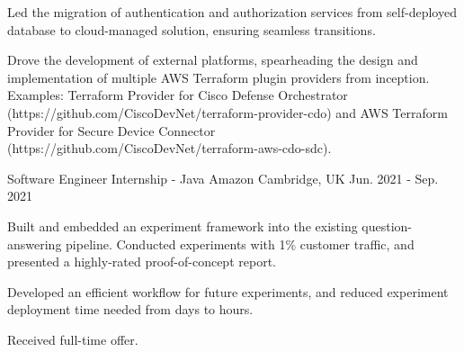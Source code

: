 \begin{cventries}
{\begin{cvitems}
        \item {Led the migration of authentication and authorization services from self-deployed database to cloud-managed solution, ensuring seamless transitions.}
        \item {Drove the development of external platforms, spearheading the design and implementation of multiple AWS Terraform plugin providers from inception. Examples: Terraform Provider for Cisco Defense Orchestrator (https://github.com/CiscoDevNet/terraform-provider-cdo) and AWS Terraform Provider for Secure Device Connector (https://github.com/CiscoDevNet/terraform-aws-cdo-sdc).}
    \end{cvitems}
    }

  \cventry
    {Software Engineer Internship - Java} %
    {Amazon} %
    {Cambridge, UK} %
    {Jun. 2021 - Sep. 2021} %
    {
      \begin{cvitems} %
        \item {Built and embedded an experiment framework into the existing question-answering pipeline. Conducted experiments with 1\% customer traffic, and presented a highly-rated proof-of-concept report.}
        \item {Developed an efficient workflow for future experiments, and reduced experiment deployment time needed from days to hours.}
        \item {Received full-time offer.}
      \end{cvitems}
    }


\end{cventries}

